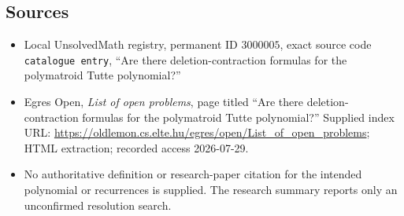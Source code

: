 \documentclass[11pt]{article}
\begin{document}
\subsection{Sources}
\begin{itemize}
\item Local UnsolvedMath registry, permanent ID \(3000005\), exact source code \texttt{catalogue entry}, ``Are there deletion-contraction formulas for the polymatroid Tutte polynomial?''
\item Egres Open, \emph{List of open problems}, page titled ``Are there deletion-contraction formulas for the polymatroid Tutte polynomial?'' Supplied index URL: \url{https://oldlemon.cs.elte.hu/egres/open/List_of_open_problems}; HTML extraction; recorded access 2026-07-29.
\item No authoritative definition or research-paper citation for the intended polynomial or recurrences is supplied. The research summary reports only an unconfirmed resolution search.
\end{itemize}
\end{document}
